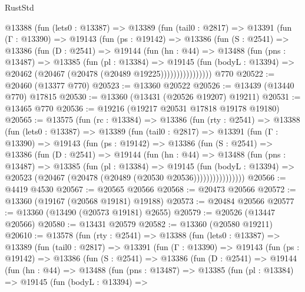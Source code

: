 \begin{lexlean}{RustStd}
\begin{coremodule}
        @13388
          (fun (lets0 : @13387) =>
          @13389
            (fun (tail0 : @2817) =>
            @13391
              (fun (Γ : @13390) =>
              @19143
                (fun (ps : @19142) =>
                @13386
                  (fun (S : @2541) =>
                  @13386
                    (fun (D : @2541) =>
                    @19144
                      (fun (hn : @44) =>
                      @13488
                        (fun (pns : @13487) =>
                        @13385
                          (fun (pl : @13384) =>
                          @19145
                            (fun (bodyL : @13394) =>
                            @20462 (@20467 (@20478 (@20489 @19225))))))))))))))))
    @770
@20522 := @20460 (@13377 @770)
@20523 := @13360 @20522
@20526 := @13439 (@13440 @770) @17815
@20530 := @13360 (@13431 (@20526 @19207) @19211)
@20531 := @13465 @770
@20536 := @19216 (@19217 @20531 @17818 @19178 @19180)
@20565 := @13575
    (fun (rc : @13384) =>
    @13386
      (fun (rty : @2541) =>
      @13388
        (fun (lets0 : @13387) =>
        @13389
          (fun (tail0 : @2817) =>
          @13391
            (fun (Γ : @13390) =>
            @19143
              (fun (ps : @19142) =>
              @13386
                (fun (S : @2541) =>
                @13386
                  (fun (D : @2541) =>
                  @19144
                    (fun (hn : @44) =>
                    @13488
                      (fun (pns : @13487) =>
                      @13385
                        (fun (pl : @13384) =>
                        @19145
                          (fun (bodyL : @13394) =>
                          @20523 (@20467 (@20478 (@20489 (@20530 @20536))))))))))))))))
@20566 := @4419 @4530
@20567 := @20565 @20566
@20568 := @20473 @20566
@20572 := @13360 (@19167 (@20568 @19181) @19188)
@20573 := @20484 @20566
@20577 := @13360 (@13490 (@20573 @19181) @2655)
@20579 := @20526 (@13447 @20566)
@20580 := @13431 @20579
@20582 := @13360 (@20580 @19211)
@20610 := @13578
    (fun (rty : @2541) =>
    @13388
      (fun (lets0 : @13387) =>
      @13389
        (fun (tail0 : @2817) =>
        @13391
          (fun (Γ : @13390) =>
          @19143
            (fun (ps : @19142) =>
            @13386
              (fun (S : @2541) =>
              @13386
                (fun (D : @2541) =>
                @19144
                  (fun (hn : @44) =>
                  @13488
                    (fun (pns : @13487) =>
                    @13385
                      (fun (pl : @13384) =>
                      @19145
                        (fun (bodyL : @13394) =>

\end{coremodule}
\end{lexlean}
